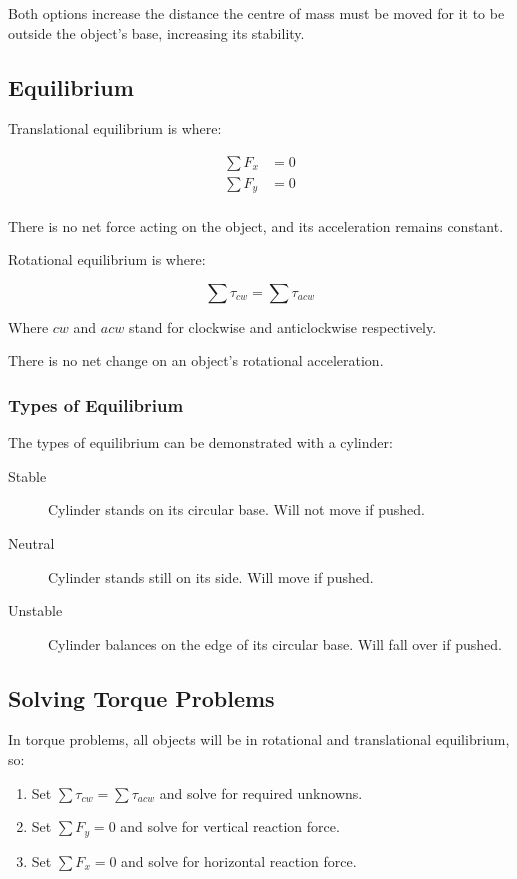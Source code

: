 \documentclass[a4paper,11pt]{article}
\begin{document}
Both options increase the distance the centre of mass must be moved for it to
be outside the object's base, increasing its stability.


\subsection{Equilibrium}

Translational equilibrium is where:

$$
\begin{aligned}
\sum F_x & = 0 \\
\sum F_y & = 0 \\
\end{aligned}
$$

There is no net force acting on the object, and its acceleration remains
constant.

Rotational equilibrium is where:

$$
\sum \tau_{cw} = \sum \tau_{acw}
$$

Where $cw$ and $acw$ stand for clockwise and anticlockwise respectively.

There is no net change on an object's rotational acceleration.


\subsubsection{Types of Equilibrium}

The types of equilibrium can be demonstrated with a cylinder:

\begin{description}
\item [Stable] Cylinder stands on its circular base. Will not move if pushed.
\item [Neutral] Cylinder stands still on its side. Will move if pushed.
\item [Unstable] Cylinder balances on the edge of its circular base. Will fall
	over if pushed.
\end{description}


\subsection{Solving Torque Problems}

In torque problems, all objects will be in rotational and translational
equilibrium, so:

\begin{enumerate}
\item Set $\sum \tau_{cw} = \sum \tau_{acw}$ and solve for required unknowns.
\item Set $\sum F_y = 0$ and solve for vertical reaction force.
\item Set $\sum F_x = 0$ and solve for horizontal reaction force.
\end{enumerate}
\end{document}
